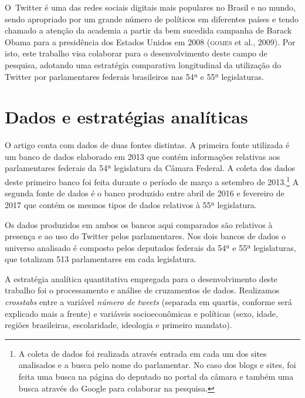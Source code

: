 O~Twitter é uma das redes sociais digitais mais populares no Brasil e no
mundo, sendo apropriado por um grande número de políticos em diferentes
países e tendo chamado a atenção da academia a partir da bem sucedida
campanha de Barack Obama para a presidência dos Estados Unidos em 2008
(\textsc{gomes} et al., 2009). Por isto, este trabalho visa colaborar para o
desenvolvimento deste campo de pesquisa, adotando uma estratégia
comparativa longitudinal da utilização do Twitter por parlamentares
federais brasileiros nas 54ª e 55ª legislaturas.

\section{Dados e estratégias analíticas}

O artigo conta com dados de duas fontes distintas. A primeira fonte
utilizada é um banco de dados elaborado em 2013 que contém informações
relativas aos parlamentares federais da 54ª legislatura da Câmara
Federal. A coleta dos dados deste primeiro banco foi feita durante o
período de março a setembro de 2013.\footnote{A coleta de dados foi
  realizada através entrada em cada um dos sites analisados e a busca
  pelo nome do parlamentar. No caso dos blogs e sites, foi feita uma
  busca na página do deputado no portal da câmara e também uma busca
  através do Google para colaborar na pesquisa.} A segunda fonte de
dados é o banco produzido entre abril de 2016 e fevereiro de 2017 que
contém os mesmos tipos de dados relativos à 55ª legislatura.

Os dados produzidos em ambos os bancos aqui comparados são relativos à
presença e ao uso do Twitter pelos parlamentares. Nos dois bancos de
dados o universo analisado é composto pelos deputados federais da 54ª e
55ª legislaturas, que totalizam 513 parlamentares em cada legislatura.

A estratégia analítica quantitativa empregada para o desenvolvimento
deste trabalho foi o processamento e análise de cruzamentos de dados.
Realizamos \textit{crosstabs} entre a variável \textit{número de tweets}
(separada em quartis, conforme será explicado mais a frente) e variáveis
socioeconômicas e políticas (sexo, idade, regiões brasileiras,
escolaridade, ideologia e primeiro mandato).

